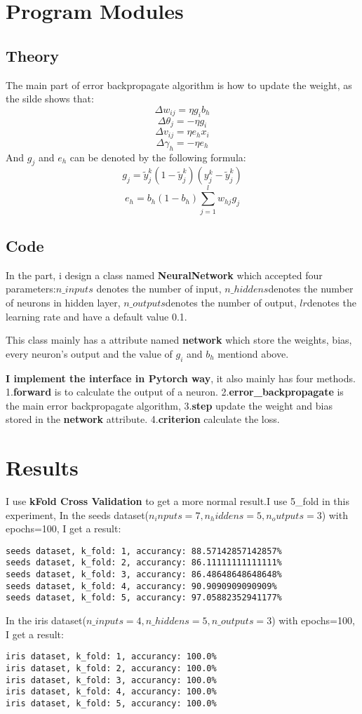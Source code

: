 \documentclass{article}
\begin{document}
\section{Program Modules}

\subsection{Theory}
The main part of error backpropagate algorithm is how to update the weight, as the silde shows that:
$$\Delta w_{ij} = \eta g_i b_h$$
$$\Delta \theta_{j} = - \eta g_i$$
$$\Delta v_{ij} = \eta e_h x_i$$
$$\Delta \gamma_{h} = - \eta e_h$$
And $g_j$ and $e_h$ can be denoted by the following formula:
$$g_j = \tilde{y}_j^k(1-\tilde{y}_j^k)(y_j^k-\tilde{y}_j^k)$$
$$e_h = b_h(1-b_h)\sum_{j=1}^{l} {w_{hj} g_j}$$

\subsection{Code}
In the part, i design a class named \textbf{NeuralNetwork} which accepted four parameters:$n\_inputs$ denotes the number of
input, $n\_hiddens$denotes the number of neurons in hidden layer, $n\_outputs$denotes the number of output, 
$lr$denotes the learning rate and have a default value 0.1.

This class mainly has a attribute named \textbf{network} which store the weights, bias, every neuron's output and the value of $g_i$ and $b_h$ mentiond above.

\textbf{I implement the interface in Pytorch way}, it also mainly has four methods. 1.\textbf{forward} is to calculate the output of a neuron.
2.\textbf{error\_backpropagate} is the main error backpropagate algorithm, 3.\textbf{step} update the weight and bias stored in the \textbf{network}
attribute. 4.\textbf{criterion} calculate the loss.

\section{Results}
I use \textbf{kFold Cross Validation} to get a more normal result.I use 5\_fold in this experiment, In the seeds dataset($n_inputs=7, n_hiddens=5, n_outputs=3$) with epochs=100, 
I get a result:
\begin{commandline}
  \begin{verbatim}
seeds dataset, k_fold: 1, accurancy: 88.57142857142857%
seeds dataset, k_fold: 2, accurancy: 86.11111111111111%
seeds dataset, k_fold: 3, accurancy: 86.48648648648648%
seeds dataset, k_fold: 4, accurancy: 90.9090909090909%
seeds dataset, k_fold: 5, accurancy: 97.05882352941177%
	\end{verbatim}
\end{commandline}
In the iris dataset($n\_inputs=4, n\_hiddens=5, n\_outputs=3$) with epochs=100, I get a result:
\begin{commandline}
  \begin{verbatim}
iris dataset, k_fold: 1, accurancy: 100.0%
iris dataset, k_fold: 2, accurancy: 100.0%
iris dataset, k_fold: 3, accurancy: 100.0%
iris dataset, k_fold: 4, accurancy: 100.0%
iris dataset, k_fold: 5, accurancy: 100.0%
	\end{verbatim}
\end{commandline}
\end{document}
